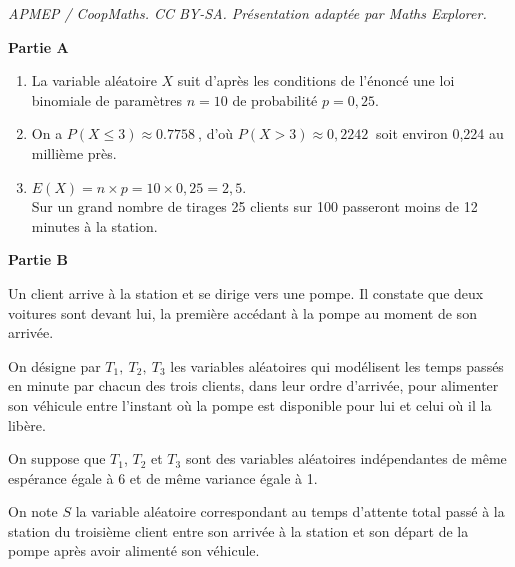 \documentclass[10pt]{article}
\providecommand{\np}[2][]{{#2~#1}}
\begin{document}
\noindent\textit{APMEP / CoopMaths. CC BY-SA. Présentation adaptée par Maths Explorer.}\par\medskip
\medskip

\begin{center}\textbf{Partie A } \end{center}





\medskip

\begin{enumerate}
\item 
La variable aléatoire $X$ suit d'après les conditions de l'énoncé une loi binomiale de paramètres $n = 10$ de probabilité $p = 0,25$.

\item 
On a $P(X \leqslant 3) \approx \np{0.7758}$, d'où $P(X > 3) \approx \np{0,2242}$ soit environ 0,224 au millième près.

\item 
$E(X) = n \times p = 10 \times 0,25 = 2,5$.\\
Sur un grand nombre de tirages  25 clients sur 100 passeront moins de 12 minutes à la station.
\end{enumerate}

\begin{center}\textbf{Partie B } \end{center}

Un client arrive à la station et se dirige vers une pompe. Il constate que deux voitures sont
devant lui, la première accédant à la pompe au moment de son arrivée.

On désigne par $T_1,\: T_2,\: T_3$ les variables aléatoires qui modélisent les temps passés en minute par chacun des trois clients, dans leur ordre d'arrivée, pour alimenter son véhicule entre l'instant où la pompe est disponible pour lui et celui où il la libère.

On suppose que $T_1$, $T_2$ et $T_3$ sont des variables aléatoires indépendantes de même espérance égale à $6$ et de même variance égale à 1.

On note $S$ la variable aléatoire correspondant au temps d'attente total passé à la station du troisième client entre son arrivée à la station et son départ de la pompe après avoir alimenté son véhicule.

\medskip
\end{document}
